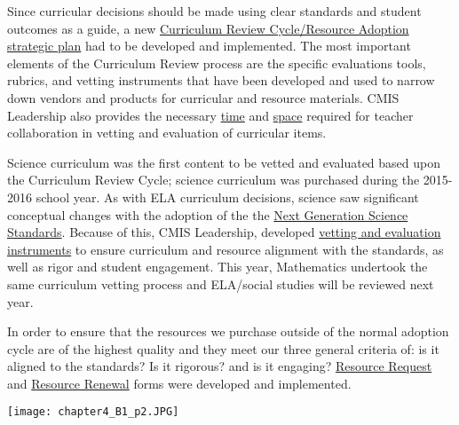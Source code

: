 \begin{findings}
\href{https://docs.google.com/a/cmis.ac.th/document/d/1hh1nLUlJgg1hd7s6aG3u3We0L6o7Wg_ECdjc2f6DcT8/edit?usp=sharing}{}

Since curricular decisions should be made using clear standards and student outcomes as a guide, a new \href{https://docs.google.com/presentation/d/15ZhVBwOO3psFCM44ybsXFUNqrhpHmVHdekAzIXjRJ5U/edit?usp=sharing}{Curriculum Review Cycle/Resource Adoption strategic plan} had to be developed and implemented. The most important elements of the Curriculum Review process are the specific evaluations tools, rubrics, and vetting instruments that have been developed and used to narrow down vendors and products for curricular and resource materials. CMIS Leadership also provides the necessary \href{https://drive.google.com/file/d/0B4n_WCeTYd4_U2J0YnRWYVp4bk0/view?usp=sharing}{time} and \href{https://drive.google.com/file/d/0B4n_WCeTYd4_NjBfVm92blF6T00/view?usp=sharing}{space} required for teacher collaboration in vetting and evaluation of curricular items. 

Science curriculum was the first content to be vetted and evaluated based upon the Curriculum Review Cycle; science curriculum was purchased during the 2015-2016 school year. As with ELA curriculum decisions, science saw significant conceptual changes with the adoption of the the \href{https://drive.google.com/a/cmis.ac.th/file/d/0B71_pYxcTLo-eUtQZE9DLTFvYUE/view?usp=sharing}{Next Generation Science Standards}. Because of this, CMIS Leadership, developed \href{https://docs.google.com/a/cmis.ac.th/document/d/1u0crwv2uVJdfamGYP9NYsUvub7bkPO64dIu0uAAkSIo/edit?usp=sharing}{vetting and evaluation instruments} to ensure curriculum and resource alignment with the standards, as well as rigor and student engagement. This year, Mathematics undertook the same curriculum vetting process and ELA/social studies will be reviewed next year. 

In order to ensure that the resources we purchase outside of the normal adoption cycle are of the highest quality and they meet our three general criteria of: is it aligned to the standards? Is it rigorous? and is it engaging? \href{https://goo.gl/forms/715q4GLbzFj9JRPZ2}{Resource Request} and \href{https://goo.gl/forms/N2Oow0UnpUr7bOzw1}{Resource Renewal} forms were developed and implemented. 

{\centering\texttt{[image: chapter4\_B1\_p2.JPG]}}



\end{findings}

